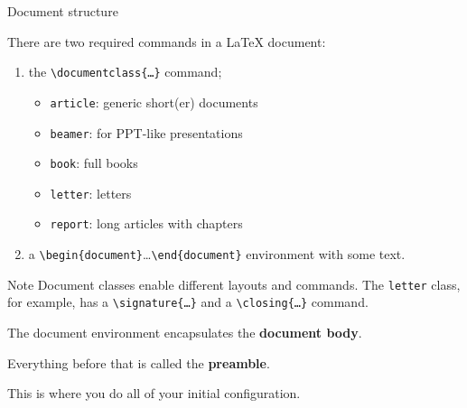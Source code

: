 \documentclass{beamer}
\newcommand{\code}[1]{\texttt{#1}}
\newcommand{\command}[2]{\texttt{\textbackslash#1\{#2\}}}
\newcommand{\latexenv}[1]{\texttt{\textbackslash{}begin\{#1\}}\ldots\texttt{\textbackslash{}end\{#1\}}}
\begin{document}
\begin{frame}{Document structure}

     {
        There are two required commands in a \LaTeX{} document:

        \begin{enumerate}
            \item the \command{documentclass}{\ldots} command;
                  \begin{itemize}
                      \item \code{article}: generic short(er) documents
                      \item \code{beamer}: for PPT-like presentations
                      \item \code{book}: full books
                      \item \code{letter}: letters
                      \item \code{report}: long articles with chapters
                  \end{itemize}
            \item a \latexenv{document} environment with some text.
        \end{enumerate}

        \medskip

        \begin{block}{Note}
            Document classes enable different layouts and commands. The \code{letter} class, for example, has a \command{signature}{\ldots} and a \command{closing}{\ldots} command.
        \end{block}
    }

     {
        The document environment encapsulates the \textbf{document body}.

        \medskip

        Everything before that is called the \textbf{preamble}.

        \medskip

        This is where you do all of your initial configuration.
    }
\end{frame}
\end{document}

